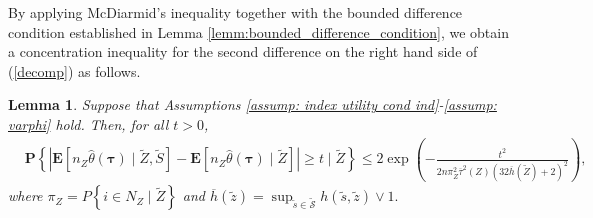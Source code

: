 \documentclass[12pt, fullpage]{amsart}
\newtheorem{lemma}{Lemma}[section]
\theoremstyle{definition}
\theoremstyle{definition}
\theoremstyle{definition}
\begin{document}
\begin{bibunit}[econometrica]
By applying McDiarmid's inequality together with the bounded difference condition established in Lemma \ref{lemm:bounded_difference_condition}, we obtain a concentration inequality for the second difference on the right hand side of (\ref{decomp}) as follows.

\begin{lemma}\label{lemm:conc_ineq} Suppose that Assumptions \ref{assump: index utility cond ind}-\ref{assump: varphi} hold. Then, for all $t > 0$,
	\begin{align*}
		&\mathbf{P}\left\{ \left| \mathbf{E}\left[ n_Z \hat \theta(\boldsymbol{\tau}) \mid \tilde Z, \tilde S \right] - \mathbf{E}\left[ n_Z \hat \theta(\boldsymbol{\tau}) \mid \tilde Z \right] \right| \ge t \mid \tilde Z\right\}  \le 2 \exp\left(-\frac{ t^2}{2 \displaystyle n \pi_Z^2 \overline \tau^2(Z) \left(32\overline h(\tilde Z)+ 2\right)^2}\right),
	\end{align*}
	where $\pi_Z = P\left\{ i \in N_Z \mid \tilde Z \right\}$ and $\overline h(\tilde z) = \sup_{\tilde s \in \mathcal{\tilde S}} h(\tilde s, \tilde z) \vee 1.$
\end{lemma}


\end{bibunit}
\end{document}
